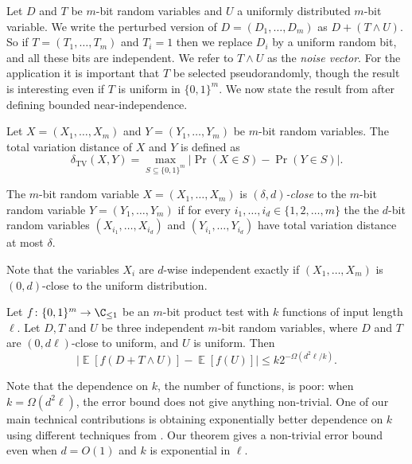 \documentclass{toc}
\newcommand{\zo}{\{0,1\}}
\def\Blocklength{\ell}
\DeclareMathOperator*{\E}{\mathbb{E}}                 %
\DeclareMathOperator*{\TV}{TV}     %
\begin{document}
Let $D$ and $T$ be $m$-bit random variables and $U$ a uniformly
distributed $m$-bit variable.  We write the perturbed version
of $D=(D_1,\dots,D_m)$ as $D+(T\wedge U)$.  So if $T=(T_1,\dots,T_m)$
and $T_i=1$ then we replace $D_i$ by a uniform random bit,
and all these bits are independent.  %
We refer to $T\wedge U$ as the \emph{noise vector}.
%
%
%
For the application it is important that $T$
%
be  %
selected pseudorandomly,
though the result is interesting even if $T$ is uniform in $\zo^m$.
We now state the result
%
from  %
\cite{HaramatyLV-bipnfp} after defining 
bounded near-independence.

%
%
%
%
%
%
\begin{definition}
Let $X=(X_1,\ldots,X_m)$ and $Y=(Y_1,\ldots,Y_m)$ be
$m$-bit random variables.  The total variation distance
of $X$ and $Y$ is defined as
\[ \delta_{\TV}(X,Y)= \max_{S\subseteq \zo^m} |\Pr(X\in S) - \Pr(Y\in S)| . \]
%
%
\end{definition}

%
%
\begin{definition} \label{def-almost-independent}
The $m$-bit random variable $X=(X_1, \ldots, X_m)$ is
\emph{$(\delta,d)$-close} to
the $m$-bit random variable %
$Y=(Y_1, \ldots, Y_m)$
%
%
%
%
%
if for every $i_1, \ldots, i_d \in  \{ 1, 2, \ldots, m \}$ the
%
the $d$-bit random variables
$(X_{i_1}, \ldots, X_{i_d})$ and $(Y_{i_1}, \ldots, Y_{i_d})$ have
total variation distance at most $\delta$.
\end{definition}
%
%
%
%
Note that the variables $X_i$ are $d$-wise independent
exactly if $(X_1,\dots,X_m)$ is $(0,d)$-close to the uniform
distribution.

%
\begin{theorem} \label{thm:HLV}
  Let $f\colon \zo^m \to \C_{\le 1}$ be an %
  $m$-bit %
  product test with $k$ functions
  of input length $\Blocklength$.
  Let $D,T$ and $U$ be three independent $m$-bit random variables, where
  $D$ and $T$ 
  are $(0,d\Blocklength)$-close to uniform, and $U$ is uniform.
Then
\[
	\bigl| \E[f(D + T \wedge U)] - \E[f(U)] \bigr|
        \le k 2^{-\Omega(d^2 \Blocklength/k)} .
\]
%
\end{theorem}
Note that the dependence on %
%
$k$, the number of functions,
is poor:
when $k = \Omega(d^2 \Blocklength)$, the error bound does not give
anything non-trivial.
%
One of our main technical contributions  %
is obtaining exponentially better
%
dependence    %
on $k$ using different techniques from \cite{HaramatyLV-bipnfp}.
Our theorem gives
a  %
non-trivial error bound even when $d = O(1)$ and $k$
is exponential in $\Blocklength$.
\end{document}
